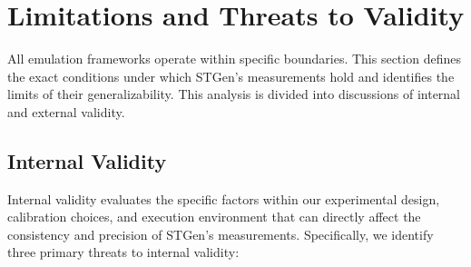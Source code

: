 \documentclass[jsan,article,submit,moreauthors,pdftex]{Definitions/mdpi}
\begin{document}
\section{Limitations and Threats to Validity}
\label{sec:threats}

All emulation frameworks operate within specific boundaries. This section defines the exact conditions under which STGen's measurements hold and identifies the limits of their generalizability. This analysis is divided into discussions of internal and external validity.



\subsection*{Internal Validity}
Internal validity evaluates the specific factors within our experimental design, calibration choices, and execution environment that can directly affect the consistency and precision of STGen’s measurements. Specifically, we identify three primary threats to internal validity:
\end{document}
